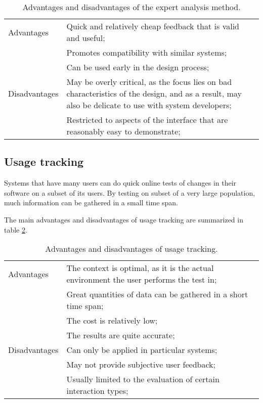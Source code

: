 \begin{table}[H]
	\begin{center}
		\begin{tabular}{l p{300px}}
			\hline
			Advantages		&		Quick and relatively cheap feedback that is valid and useful; \\
										&		Promotes compatibility with similar systems; \\
										&		Can be used early in the design process; \\
			\hline
			Disadvantages	&		May be overly critical, as the focus lies on bad characteristics of the design, and as a result, may also be delicate to use with system developers; \\
										&		Restricted to aspects of the interface that are reasonably easy to demonstrate; \\
			\hline
		\end{tabular}
	\end{center}
	\caption{Advantages and disadvantages of the expert analysis method.}
	\label{table:expert_evaluation}
\end{table}



\subsection{Usage tracking}

Systems that have many users can do quick online tests of changes in their software on a subset of its users. By testing on subset of a very large population, much information can be gathered in a small time span.

The main advantages and disadvantages of usage tracking are summarized in table \ref{table:usage_tracking}.

\begin{table}[H]
	\begin{center}
		\begin{tabular}{l p{300px}}
			\hline
			Advantages		&		The context is optimal, as it is the actual environment the user performs the test in; \\
										&		Great quantities of data can be gathered in a short time span; \\
										&		The cost is relatively low; \\
										&		The results are quite accurate; \\
			\hline
			Disadvantages	&		Can only be applied in particular systems; \\
										&		May not provide subjective user feedback; \\
										&		Usually limited to the evaluation of certain interaction types; \\
			\hline
		\end{tabular}
	\end{center}
	\caption{Advantages and disadvantages of usage tracking.}
	\label{table:usage_tracking}
\end{table}





